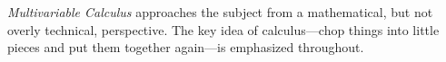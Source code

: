 
\emph{Multivariable Calculus} approaches the subject from a mathematical,
but not overly technical, perspective.  The key idea of calculus---chop
things into little pieces and put them together again---is emphasized
throughout.
